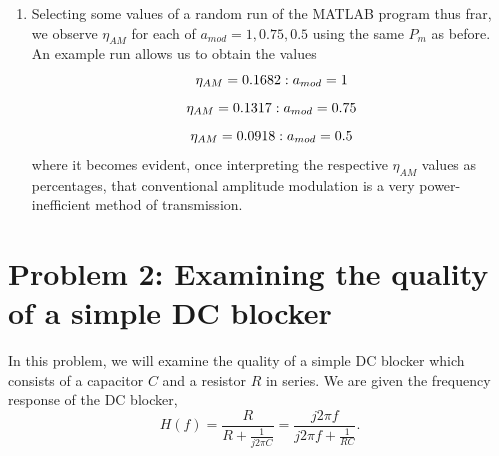 \documentclass[11pt]{article}
\begin{document}
\begin{enumerate}[label=\textbf{\alph*)}, leftmargin=2.6em]
    \item Selecting some values of a random run of the MATLAB program thus frar,
    we observe $\eta_{AM}$ for each of $a_{mod}=1, 0.75, 0.5$ using
    the same $P_m$ as before. An example run allows us to obtain the values\\
    \begin{equation} \notag
        \eta_{AM} = 0.1682 : a_{mod} = 1
    \end{equation} 
    \begin{equation} \notag
        \eta_{AM} = 0.1317 : a_{mod} = 0.75
    \end{equation} 
    \begin{equation} \notag
        \eta_{AM} = 0.0918 : a_{mod} = 0.5
    \end{equation} 
    where it becomes evident, once interpreting the respective $\eta_{AM}$ values
    as percentages, that conventional amplitude modulation is a very power-inefficient
    method of transmission.

\end{enumerate}

\section{Problem 2: Examining the quality of a simple DC blocker}
In this problem, we will examine the quality of a simple DC blocker which consists
of a capacitor $C$ and a resistor $R$ in series. We are given the frequency response
of the DC blocker,
\begin{equation}
    H(f) = \frac{R}{R+\frac{1}{j2\pi C}} = \frac{j2\pi f}{j2\pi f + \frac{1}{RC}}.
\end{equation}
\end{document}
